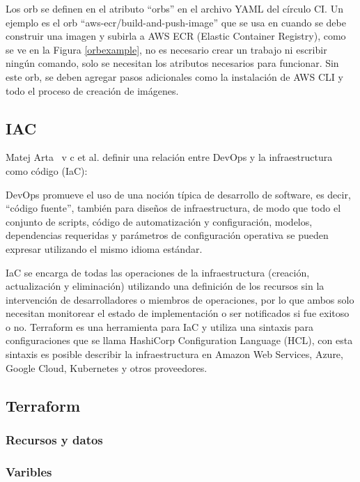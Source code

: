 Los orb se definen en el atributo ``orbs'' en el archivo YAML del círculo CI. Un ejemplo es el orb ``aws-ecr/build-and-push-image'' que se usa en cuando se debe construir una imagen y subirla a AWS ECR (Elastic Container Registry), como se ve en la Figura \ref{orbexample}, no es necesario crear un trabajo ni escribir ningún comando, solo se necesitan los atributos necesarios para funcionar. Sin este orb, se deben agregar pasos adicionales como la instalación de AWS CLI y todo el proceso de creación de imágenes.

\subsection {IAC}

Matej Arta \ v {c} et al. definir una relación entre DevOps y la infraestructura como código (IaC):

\relax
{}\relax

DevOps promueve el uso de una noción típica de desarrollo de software, es decir, ``código fuente'', también para diseños de infraestructura, de modo que todo el conjunto de scripts, código de automatización y configuración, modelos, dependencias requeridas y parámetros de configuración operativa se pueden expresar utilizando el mismo idioma estándar. \cite{devopsiac}

\relax
{}\relax

IaC se encarga de todas las operaciones de la infraestructura (creación, actualización y eliminación) utilizando una definición de los recursos sin la intervención de desarrolladores o miembros de operaciones, por lo que ambos solo necesitan monitorear el estado de implementación o ser notificados si fue exitoso o no.
Terraform \cite{terraform} es una herramienta para IaC y utiliza una sintaxis para configuraciones que se llama HashiCorp Configuration Language (HCL), con esta sintaxis es posible describir la infraestructura en Amazon Web Services, Azure, Google Cloud, Kubernetes y otros proveedores.

\subsection {Terraform}
\subsubsection {Recursos y datos}
\subsubsection {Varibles}
